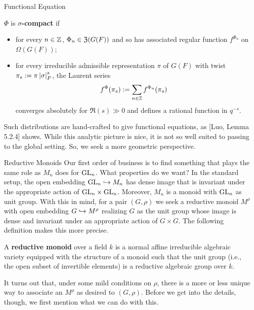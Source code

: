 \documentclass[aspectratio=1610]{beamer}
\begin{document}
\begin{frame}{Functional Equation}
\pause
\begin{definition}
$\Phi$ is \textbf{$\sigma$-compact} if
\begin{itemize}
\pause\item for every $n\in\mathbb{Z}$, $\Phi_n\in\mathfrak{Z}(G(F))$ and so has associated regular function $f^{\Phi_n}$ on $\Omega(G(F))$;

\pause\item for every irreducible admissible representation $\pi$ of $G(F)$ with twist $\pi_s:=\pi\left\lvert\sigma\right\rvert_F^s$, the Laurent series 
$$f^{\Phi}(\pi_s):=\sum_{n\in\mathbb{Z}}f^{\Phi_n}(\pi_s)$$
converges absolutely for $\Re(s)\gg0$ and defines a rational function in $q^{-s}$.
\end{itemize}
\end{definition}

\pause Such distributions are hand-crafted to give functional equations, as [Luo, Lemma 5.2.4] shows. \pause While this analytic picture is nice, it is not so well suited to passing to the global setting. So, we seek a more geometric perspective.
\end{frame}

\begin{frame}{Reductive Monoids}
\pause Our first order of business is to find something that plays the same role as $M_n$ does for $\textup{GL}_n$. What properties do we want? \pause In the standard setup, the open embedding $\textup{GL}_n\hookrightarrow M_n$ has dense image that is invariant under the appropriate action of $\textup{GL}_n\times\textup{GL}_n$. \pause Moreover, $M_n$ is a monoid with $\textup{GL}_n$ as unit group. \pause With this in mind, for a pair $(G,\rho)$ we seek a reductive monoid $M^{\rho}$ with open embedding $G\hookrightarrow M^{\rho}$ realizing $G$ as the unit group whose image is dense and invariant under an appropriate action of $G\times G$. \pause The following definition makes this more precise.

\begin{definition}
A \textbf{reductive monoid} over a field $k$ is a normal affine irreducible algebraic variety equipped with the structure of a monoid such that the unit group (i.e., the open subset of invertible elements) is a reductive algebraic group over $k$.
\end{definition}

\pause It turns out that, under some mild conditions on $\rho$, there is a more or less unique way to associate an $M^{\rho}$ as desired to $(G,\rho)$. \pause Before we get into the details, though, we first mention what we can do with this.
\end{frame}
\end{document}
